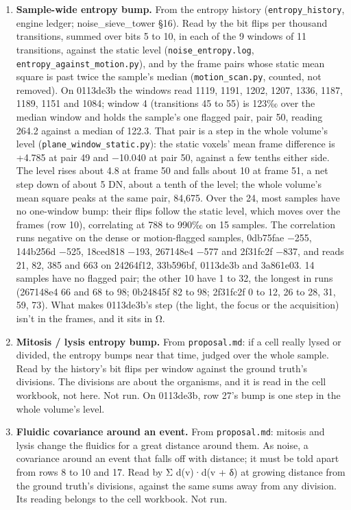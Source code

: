 \begin{enumerate}
\item \textbf{Sample-wide entropy bump.} From the entropy history (\texttt{entropy\_\allowbreak{}history}, engine ledger; noise\_\allowbreak{}sieve\_\allowbreak{}tower §16). Read by the bit flips per thousand transitions, summed over bits 5 to 10, in each of the 9 windows of 11 transitions, against the static level (\texttt{noise\_\allowbreak{}entropy.\allowbreak{}log}, \texttt{entropy\_\allowbreak{}against\_\allowbreak{}motion.\allowbreak{}py}), and by the frame pairs whose static mean square is past twice the sample's median (\texttt{motion\_\allowbreak{}scan.\allowbreak{}py}, counted, not removed). On 0113de3b the windows read 1119, 1191, 1202, 1207, 1336, 1187, 1189, 1151 and 1084; window 4 (transitions 45 to 55) is 123‰ over the median window and holds the sample's one flagged pair, pair 50, reading 264.2 against a median of 122.3. That pair is a step in the whole volume's level (\texttt{plane\_\allowbreak{}window\_\allowbreak{}static.\allowbreak{}py}): the static voxels' mean frame difference is +4.785 at pair 49 and −10.040 at pair 50, against a few tenths either side. The level rises about 4.8 at frame 50 and falls about 10 at frame 51, a net step down of about 5 DN, about a tenth of the level; the whole volume's mean square peaks at the same pair, 84,675. Over the 24, most samples have no one-window bump: their flips follow the static level, which moves over the frames (row 10), correlating at 788 to 990‰ on 15 samples. The correlation runs negative on the dense or motion-flagged samples, 0db75fae −255, 144b256d −525, 18ced818 −193, 267148e4 −577 and 2f31fc2f −837, and reads 21, 82, 385 and 663 on 24264f12, 33b596bf, 0113de3b and 3a861e03. 14 samples have no flagged pair; the other 10 have 1 to 32, the longest in runs (267148e4 66 and 68 to 98; 0b24845f 82 to 98; 2f31fc2f 0 to 12, 26 to 28, 31, 59, 73). What makes 0113de3b's step (the light, the focus or the acquisition) isn't in the frames, and it sits in Ω.
\item \textbf{Mitosis / lysis entropy bump.} From \texttt{proposal.\allowbreak{}md}: if a cell really lysed or divided, the entropy bumps near that time, judged over the whole sample. Read by the history's bit flips per window against the ground truth's divisions. The divisions are about the organisms, and it is read in the cell workbook, not here. Not run. On 0113de3b, row 27's bump is one step in the whole volume's level.
\item \textbf{Fluidic covariance around an event.} From \texttt{proposal.\allowbreak{}md}: mitosis and lysis change the fluidics for a great distance around them. As noise, a covariance around an event that falls off with distance; it must be told apart from rows 8 to 10 and 17. Read by Σ d(v)·d(v + δ) at growing distance from the ground truth's divisions, against the same sums away from any division. Its reading belongs to the cell workbook. Not run.

\end{enumerate}
